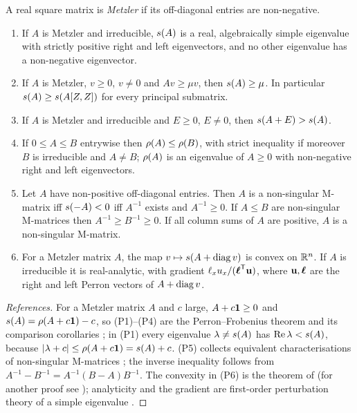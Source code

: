 \begin{lemma}\label{s3_r0:lem:facts}
  A real square matrix is \emph{Metzler} if its off-diagonal entries are non-negative.
  \begin{enumerate}[label=\textup{(P\arabic*)},leftmargin=*]
    \item If $A$ is Metzler and irreducible, $s(A)$ is a real, algebraically simple eigenvalue with
      strictly positive right and left eigenvectors, and no other eigenvalue has a non-negative eigenvector.
    \item If $A$ is Metzler, $v\ge 0$, $v\ne 0$ and $Av\ge\mu v$, then $s(A)\ge\mu$.  In particular
      $s(A)\ge s(A[Z,Z])$ for every principal submatrix.
    \item If $A$ is Metzler and irreducible and $E\ge 0$, $E\ne 0$, then $s(A+E)>s(A)$.
    \item If $0\le A\le B$ entrywise then $\rho(A)\le\rho(B)$, with strict inequality if moreover $B$ is
      irreducible and $A\ne B$; $\rho(A)$ is an eigenvalue of $A\ge0$ with non-negative right and left eigenvectors.
    \item Let $A$ have non-positive off-diagonal entries.  Then $A$ is a non-singular M-matrix iff
      $s(-A)<0$ iff $A^{-1}$ exists and $A^{-1}\ge0$.  If $A\le B$ are non-singular M-matrices then
      $A^{-1}\ge B^{-1}\ge0$.  If all column sums of $A$ are positive, $A$ is a non-singular M-matrix.
    \item For a Metzler matrix $A$, the map $v\mapsto s(A+\operatorname{diag} v)$ is convex on $\mathbb{R}^{n}$.
      If $A$ is irreducible it is real-analytic, with gradient $\ell_xu_x/(\boldsymbol{\ell}^{\mathsf{T}}\mathbf{u})$, where $\mathbf{u},\boldsymbol{\ell}$ are the
      right and left Perron vectors of $A+\operatorname{diag} v$.
  \end{enumerate}
\end{lemma}

\begin{proof}[References]
  For a Metzler matrix $A$ and $c$ large, $A+c\mathbf{1}\ge0$ and $s(A)=\rho(A+c\mathbf{1})-c$, so (P1)--(P4) are the
  Perron--Frobenius theorem and its comparison corollaries \citep[Chapter~2]{berman1994nonnegative}; in (P1)
  every eigenvalue $\lambda\ne s(A)$ has $\operatorname{Re}\lambda<s(A)$, because
  $|\lambda+c|\le\rho(A+c\mathbf{1})=s(A)+c$.  (P5) collects equivalent characterisations of non-singular M-matrices
  \citep[Chapter~6]{berman1994nonnegative}; the inverse inequality follows from
  $A^{-1}-B^{-1}=A^{-1}(B-A)B^{-1}$.  The convexity in (P6) is the theorem of \citet{cohen1981convexity} (for another
  proof see \citet{kato1982superconvexity}); analyticity and the gradient are first-order perturbation theory of a simple
  eigenvalue \citep[Chapter~II, \S1]{kato1995perturbation}.
\end{proof}


